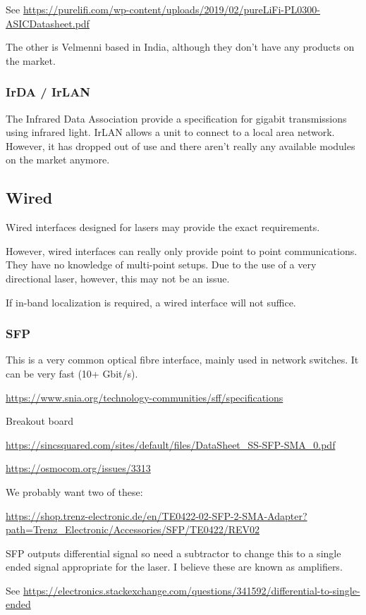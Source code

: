 See \url{https://purelifi.com/wp-content/uploads/2019/02/pureLiFi-PL0300-ASICDatasheet.pdf}

The other is Velmenni based in India, although they don't have any products
on the market.

\subsubsection{IrDA / IrLAN}
The Infrared Data Association provide a specification for gigabit transmissions
using infrared light. IrLAN allows a unit to connect to a local area network.
However, it has dropped out of use and there aren't really any available
modules on the market anymore.

\subsection{Wired}
Wired interfaces designed for lasers may provide the exact requirements.

However, wired interfaces can really only provide point to point
communications. They have no knowledge of multi-point setups. Due to the use
of a very directional laser, however, this may not be an issue.

If in-band localization is required, a wired interface will not suffice.

\subsubsection{\ac{SFP}}

This is a very common optical fibre interface, mainly used in network
switches. It can be very fast (10+ Gbit/s).

\url{https://www.snia.org/technology-communities/sff/specifications}

Breakout board

\url{https://sincsquared.com/sites/default/files/DataSheet_SS-SFP-SMA_0.pdf}

\url{https://osmocom.org/issues/3313}

We probably want two of these:

\url{https://shop.trenz-electronic.de/en/TE0422-02-SFP-2-SMA-Adapter?path=Trenz_Electronic/Accessories/SFP/TE0422/REV02}

\ac{SFP} outputs differential signal so need a subtractor to change this to
a single ended signal appropriate for the laser. I believe these are known as
amplifiers.

See \url{https://electronics.stackexchange.com/questions/341592/differential-to-single-ended}

